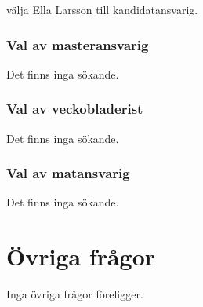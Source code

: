 \documentclass[hidelinks]{sektionsmote}
\begin{document}
\begin{beslut}
  \item välja Ella Larsson till kandidatansvarig.
\end{beslut}

\subsubsection{Val av masteransvarig}
Det finns inga sökande.

\subsubsection{Val av veckobladerist}
Det finns inga sökande.

\subsubsection{Val av matansvarig}
Det finns inga sökande.


\section{Övriga frågor}
Inga övriga frågor föreligger.
\end{document}
